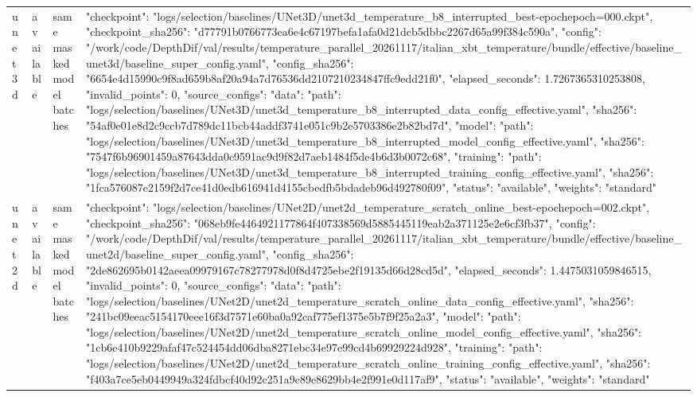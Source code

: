 \begin{tabular}{llll}
unet3d & available & same masked model batches & {"checkpoint": "logs/selection/baselines/UNet3D/unet3d_temperature_b8_interrupted_best-epochepoch=000.ckpt", "checkpoint_sha256": "d77791b0766773ea6e4c67197befa1afa0d21dcb5dbbc2267d65a99f384c590a", "config": "/work/code/DepthDif/val/results/temperature_parallel_20261117/italian_xbt_temperature/bundle/effective/baseline_unet3d/baseline_super_config.yaml", "config_sha256": "6654e4d15990c9f8ad659b8af20a94a7d76536dd2107210234847ffc9edd21f0", "elapsed_seconds": 1.7267365310253808, "invalid_points": 0, "source_configs": {"data": {"path": "logs/selection/baselines/UNet3D/unet3d_temperature_b8_interrupted_data_config_effective.yaml", "sha256": "54af0e01e8d2c9ccb7d789dc11bcb44addf3741e051c9b2e5703386e2b82bd7d"}, "model": {"path": "logs/selection/baselines/UNet3D/unet3d_temperature_b8_interrupted_model_config_effective.yaml", "sha256": "7547f6b96901459a87643dda0c9591ac9d9f82d7aeb1484f5de4b6d3b0072c68"}, "training": {"path": "logs/selection/baselines/UNet3D/unet3d_temperature_b8_interrupted_training_config_effective.yaml", "sha256": "1fca576087e2159f2d7ce41d0edb616941d4155cbedfb5bdadeb96d492780f09"}}, "status": "available", "weights": "standard"} \\
unet2d & available & same masked model batches & {"checkpoint": "logs/selection/baselines/UNet2D/unet2d_temperature_scratch_online_best-epochepoch=002.ckpt", "checkpoint_sha256": "068eb9fe4464921177864f407338569d5885445119eab2a371125e2e6cf3fb37", "config": "/work/code/DepthDif/val/results/temperature_parallel_20261117/italian_xbt_temperature/bundle/effective/baseline_unet2d/baseline_super_config.yaml", "config_sha256": "2de862695b0142aeea09979167c78277978d0f8d4725ebe2f19135d66d28cd5d", "elapsed_seconds": 1.4475031059846515, "invalid_points": 0, "source_configs": {"data": {"path": "logs/selection/baselines/UNet2D/unet2d_temperature_scratch_online_data_config_effective.yaml", "sha256": "241bc09eeac5154170eee16f3d7571e60ba0a92caf775ef1375e5b7f9f25a2a3"}, "model": {"path": "logs/selection/baselines/UNet2D/unet2d_temperature_scratch_online_model_config_effective.yaml", "sha256": "1cb6e410b9229afaf47c524454dd06dba8271ebc34e97e99cd4b69929224d928"}, "training": {"path": "logs/selection/baselines/UNet2D/unet2d_temperature_scratch_online_training_config_effective.yaml", "sha256": "f403a7ce5eb0449949a324fdbcf40d92c251a9c89e8629bb4e2f991e0d117af9"}}, "status": "available", "weights": "standard"} \\
\bottomrule
\end{tabular}

